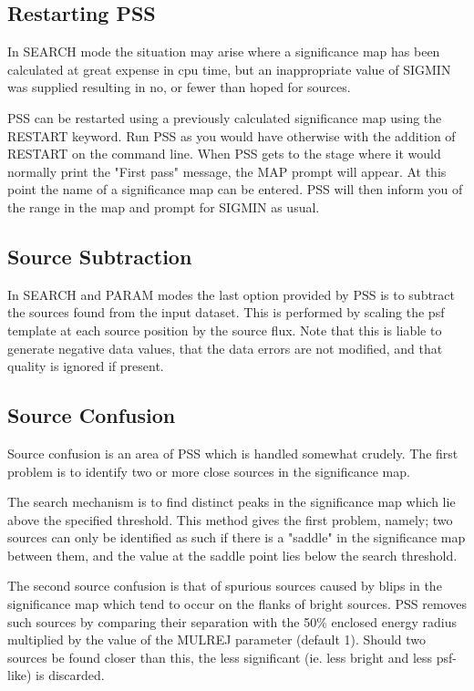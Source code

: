 \documentclass{book}
\renewcommand{\_}{{\tt\char'137}}     %
\begin{document}
\subsection{Restarting PSS}
In SEARCH mode the situation may arise where a significance map has
been calculated at great expense in cpu time, but an inappropriate
value of SIGMIN was supplied resulting in no, or fewer than hoped
for sources.
 
PSS can be restarted using a previously calculated significance map
using the RESTART keyword. Run PSS as you would have otherwise with
the addition of RESTART on the command line. When PSS gets to the
stage where it would normally print the "First pass" message, the
MAP prompt will appear. At this point the name of a significance map
can be entered. PSS will then inform you of the range in the map and
prompt for SIGMIN as usual.
 
\subsection{Source Subtraction}
In SEARCH and PARAM modes the last option provided by PSS is to
subtract the sources found from the input dataset. This is performed
by scaling the psf template at each source position by the source
flux.
Note that this is liable to generate negative data values, that the
data errors are not modified, and that quality is ignored if present.
\subsection{Source Confusion}
Source confusion is an area of PSS which is handled somewhat crudely.
The first problem is to identify two or more close sources in the
significance map.
 
The search mechanism is to find distinct peaks in the significance
map which lie above the specified threshold. This method gives the
first problem, namely;
two sources can only be identified as such if there is a "saddle"
in the significance map between them, and the value at the saddle
point lies below the search threshold.
 
The second source confusion is that of spurious sources caused by
blips in the significance map which tend to occur on the flanks of
bright sources. PSS removes such sources by comparing their separation
with the 50\% enclosed energy radius multiplied by the value of the
MULREJ parameter (default 1). Should two sources be found closer than
this, the less significant (ie. less bright and less psf-like) is
discarded.
 
\end{document}
